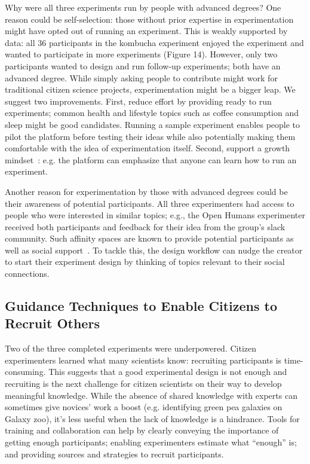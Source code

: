 Why were all three experiments run by people with advanced degrees? One reason could be self-selection: those without prior expertise in experimentation might have opted out of running an experiment. This is weakly supported by data: all 36 participants in the kombucha experiment enjoyed the experiment and wanted to participate in more experiments (Figure 14). However, only two participants wanted to design and run follow-up experiments; both have an advanced degree. While simply asking people to contribute might work for traditional citizen science projects, experimentation might be a bigger leap. We suggest two improvements. First, reduce effort by providing ready to run experiments; common health and lifestyle topics such as coffee consumption and sleep might be good candidates. Running a sample experiment enables people to pilot the platform before testing their ideas while also potentially making them comfortable with the idea of experimentation itself. Second, support a growth mindset~\cite{dweck2016having}: e.g. the platform can emphasize that anyone can learn how to run an experiment.

Another reason for experimentation by those with advanced degrees could be their awareness of potential participants. All three experimenters had access to people who were interested in similar topics; e.g., the Open Humans experimenter received both participants and feedback for their idea from the group's slack community. Such affinity spaces are known to provide potential participants as well as social support~\cite{gee2005semiotic}. To tackle this, the design workflow can nudge the creator to start their experiment design by thinking of topics relevant to their social connections.

\subsection{Guidance Techniques to Enable Citizens to Recruit Others}
Two of the three completed experiments were underpowered. Citizen experimenters learned what many scientists know: recruiting participants is time-consuming. This suggests that a good experimental design is not enough and recruiting is the next challenge for citizen scientists on their way to develop meaningful knowledge. While the absence of shared knowledge with experts can sometimes give novices' work a boost (e.g. identifying green pea galaxies on Galaxy zoo), it's less useful when the lack of knowledge is a hindrance. Tools for training and collaboration can help by clearly conveying the importance of getting enough participants; enabling experimenters estimate what “enough” is; and providing sources and strategies to recruit participants.

